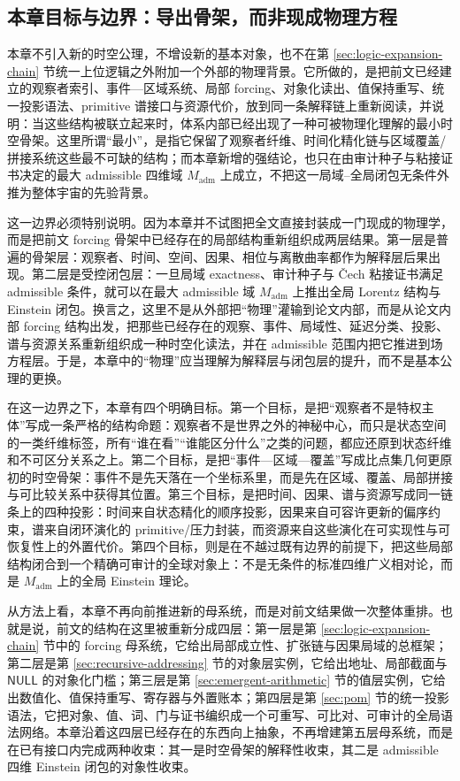 \subsection{本章目标与边界：导出骨架，而非现成物理方程}\label{subsec:physical-spacetime-skeleton-goal-boundary}

本章不引入新的时空公理，不增设新的基本对象，也不在第 \ref{sec:logic-expansion-chain} 节统一上位逻辑之外附加一个外部的物理背景。它所做的，是把前文已经建立的观察者索引、事件—区域系统、局部 forcing、对象化读出、值保持重写、统一投影语法、primitive 谱接口与资源代价，放到同一条解释链上重新阅读，并说明：当这些结构被联立起来时，体系内部已经出现了一种可被物理化理解的最小时空骨架。这里所谓“最小”，是指它保留了观察者纤维、时间化精化链与区域覆盖/拼接系统这些最不可缺的结构；而本章新增的强结论，也只在由审计种子与粘接证书决定的最大 admissible 四维域 \(M_{\mathrm{adm}}\) 上成立，不把这一局域--全局闭包无条件外推为整体宇宙的先验背景。

这一边界必须特别说明。因为本章并不试图把全文直接封装成一门现成的物理学，而是把前文 forcing 骨架中已经存在的局部结构重新组织成两层结果。第一层是普遍的骨架层：观察者、时间、空间、因果、相位与离散曲率都作为解释层后果出现。第二层是受控闭包层：一旦局域 exactness、审计种子与 \v{C}ech 粘接证书满足 admissible 条件，就可以在最大 admissible 域 \(M_{\mathrm{adm}}\) 上推出全局 Lorentz 结构与 Einstein 闭包。换言之，这里不是从外部把“物理”灌输到论文内部，而是从论文内部 forcing 结构出发，把那些已经存在的观察、事件、局域性、延迟分类、投影、谱与资源关系重新组织成一种时空化读法，并在 admissible 范围内把它推进到场方程层。于是，本章中的“物理”应当理解为解释层与闭包层的提升，而不是基本公理的更换。

在这一边界之下，本章有四个明确目标。第一个目标，是把“观察者不是特权主体”写成一条严格的结构命题：观察者不是世界之外的神秘中心，而只是状态空间的一类纤维标签，所有“谁在看”“谁能区分什么”之类的问题，都应还原到状态纤维和不可区分关系之上。第二个目标，是把“事件—区域—覆盖”写成比点集几何更原初的时空骨架：事件不是先天落在一个坐标系里，而是先在区域、覆盖、局部拼接与可比较关系中获得其位置。第三个目标，是把时间、因果、谱与资源写成同一链条上的四种投影：时间来自状态精化的顺序投影，因果来自可容许更新的偏序约束，谱来自闭环演化的 primitive/压力封装，而资源来自这些演化在可实现性与可恢复性上的外置代价。第四个目标，则是在不越过既有边界的前提下，把这些局部结构闭合到一个精确可审计的全球对象上：不是无条件的标准四维广义相对论，而是 \(M_{\mathrm{adm}}\) 上的全局 Einstein 理论。

从方法上看，本章不再向前推进新的母系统，而是对前文结果做一次整体重排。也就是说，前文的结构在这里被重新分成四层：第一层是第 \ref{sec:logic-expansion-chain} 节中的 forcing 母系统，它给出局部成立性、扩张链与因果局域的总框架；第二层是第 \ref{sec:recursive-addressing} 节的对象层实例，它给出地址、局部截面与 \(\mathsf{NULL}\) 的对象化门槛；第三层是第 \ref{sec:emergent-arithmetic} 节的值层实例，它给出数值化、值保持重写、寄存器与外置账本；第四层是第 \ref{sec:pom} 节的统一投影语法，它把对象、值、词、门与证书编织成一个可重写、可比对、可审计的全局语法网络。本章沿着这四层已经存在的东西向上抽象，不再增建第五层母系统，而是在已有接口内完成两种收束：其一是时空骨架的解释性收束，其二是 admissible 四维 Einstein 闭包的对象性收束。
